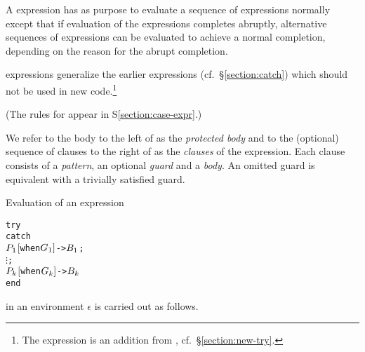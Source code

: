 \label{section:try-expr}

A  expression has as purpose to evaluate a sequence of
expressions normally except that if evaluation of the expressions
completes abruptly, alternative sequences of expressions can be
evaluated to achieve a normal
completion,
depending on the reason for the abrupt completion.

 expressions generalize the earlier  expressions (cf.\
\S\ref{section:catch}) which should not be used in new code.\ifDiff\footnote{The 
expression is an addition from \OldErlang, cf.~\S\ref{section:new-try}.}\fi

\SYNTAX

\begin{rules}
\ifStd
{}
       {   \NT{\CrtClauses}  \OR
        \TXT{try} \NT{Body} \TXT{end}}
\fi
\end{rules}
(The rules for \NT{\CrtClauses} appear in S\ref{section:case-expr}.)

We refer to the body to the left of  as
the \emph{protected body} and to the (optional) sequence of clauses to the
right of \T{catch} as the \emph{clauses} of the
 expression.  Each clause consists of a \emph{pattern}, an optional
\emph{guard} and a \emph{body}.
An omitted guard is equivalent with a trivially satisfied  guard.

\EVALUATION

Evaluation of an expression
\begin{alltt}
try
catch
    \(\Z{P}\sb{1}\) \([\)when \(\Z{G}\sb{1}]\) -> \(\Z{B}\sb{1}\) ;
    \(\vdots\) ;
    \(\Z{P}\sb{k}\) \([\)when \(\Z{G}\sb{k}]\) -> \(\Z{B}\sb{k}\)
end
\end{alltt}
in an environment $\epsilon$ is carried out as follows.

